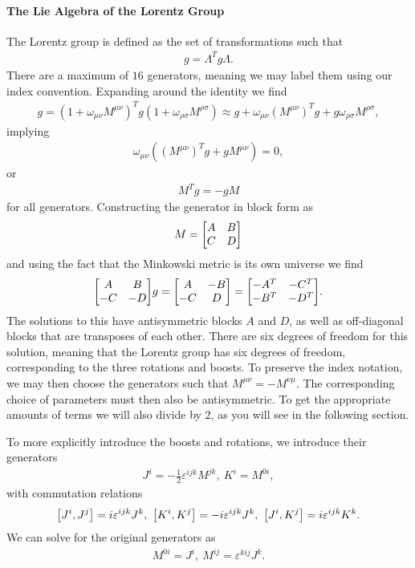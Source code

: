 \paragraph{The Lie Algebra of the Lorentz Group}
The Lorentz group is defined as the set of transformations such that
\begin{align*}
	g = \Lambda^{T}g\Lambda.
\end{align*}
There are a maximum of $16$ generators, meaning we may label them using our index convention. Expanding around the identity we find
\begin{align*}
	g = (1 + \omega_{\mu\nu}M^{\mu\nu})^{T}g(1 + \omega_{\rho\sigma}M^{\rho\sigma}) \approx g + \omega_{\mu\nu}(M^{\mu\nu})^{T}g + g\omega_{\rho\sigma}M^{\rho\sigma},
\end{align*}
implying
\begin{align*}
	\omega_{\mu\nu}((M^{\mu\nu})^{T}g + gM^{\mu\nu}) = 0,
\end{align*}
or
\begin{align*}
	M^{T}g = -gM
\end{align*}
for all generators. Constructing the generator in block form as
\begin{align*}
	M = 
	\mqty[
		A & B \\
		C & D
	]
\end{align*}
and using the fact that the Minkowski metric is its own universe we find
\begin{align*}
	\mqty[
		A & B \\
		-C & -D
	]g = \mqty[
		A & -B \\
		-C & D
	] = \mqty[
		-A^{T} & -C^{T} \\
		-B^{T} & -D^{T}
	].
\end{align*}
The solutions to this have antisymmetric blocks $A$ and $D$, as well as off-diagonal blocks that are transposes of each other. There are six degrees of freedom for this solution, meaning that the Lorentz group has six degrees of freedom, corresponding to the three rotations and boosts. To preserve the index notation, we may then choose the generators such that $M^{\mu\nu} = -M^{\nu\mu}$. The corresponding choice of parameters must then also be antisymmetric. To get the appropriate amounts of terms we will also divide by $2$, as you will see in the following section.

To more explicitly introduce the boosts and rotations, we introduce their generators
\begin{align*}
	J^{i} = -\frac{1}{2}\varepsilon^{ijk}M^{jk},\ K^{i} = M^{0i},
\end{align*}
with commutation relations
\begin{align*}
	\comm{J^{i}}{J^{j}} = i\varepsilon^{ijk}J^{k},\ \comm{K^{i}}{K^{j}} = -i\varepsilon^{ijk}J^{k},\ \comm{J^{i}}{K^{j}} = i\varepsilon^{ijk}K^{k}.
\end{align*}
We can solve for the original generators as
\begin{align*}
	M^{0i} = J^{i},\ M^{ij} = \varepsilon^{kij}J^{k}.
\end{align*}

